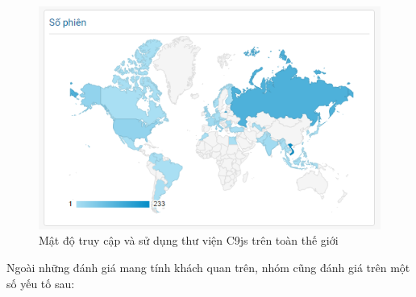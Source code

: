 \documentclass[12pt,a4paper]{article}
\begin{document}
\begin{figure}[!h]
	\begin{center}
    \includegraphics[scale=1]{image/ga_map}
    \caption{Mật độ truy cập và sử dụng thư viện C9js trên toàn thế giới}
    \label{fig:ga_map}
	\end{center}
\end{figure}
Ngoài những đánh giá mang tính khách quan trên, nhóm cũng đánh giá trên một số yếu tố sau:
\end{document}
